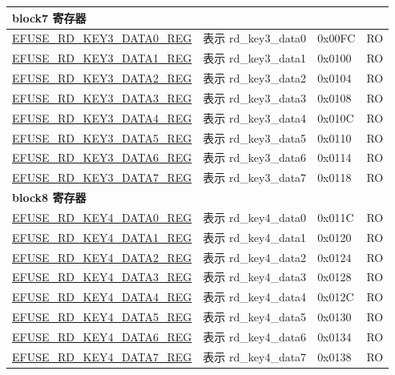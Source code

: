 \begin{longtable}{ | p{7cm} | p{6cm} | p{1.2cm} | p{1.5cm} | }
\multicolumn{4}{|l|}{\textbf{block7 寄存器}} \\ \hline
\hyperref[regdesc:EFUSERDKEY3DATANREG]{EFUSE\_RD\_KEY3\_DATA0\_REG} & 表示 rd\_key3\_data0 & 0x00FC & RO \\ \hline
\hyperref[regdesc:EFUSERDKEY3DATANREG]{EFUSE\_RD\_KEY3\_DATA1\_REG} & 表示 rd\_key3\_data1 & 0x0100 & RO \\ \hline
\hyperref[regdesc:EFUSERDKEY3DATANREG]{EFUSE\_RD\_KEY3\_DATA2\_REG} & 表示 rd\_key3\_data2 & 0x0104 & RO \\ \hline
\hyperref[regdesc:EFUSERDKEY3DATANREG]{EFUSE\_RD\_KEY3\_DATA3\_REG} & 表示 rd\_key3\_data3 & 0x0108 & RO \\ \hline
\hyperref[regdesc:EFUSERDKEY3DATANREG]{EFUSE\_RD\_KEY3\_DATA4\_REG} & 表示 rd\_key3\_data4 & 0x010C & RO \\ \hline
\hyperref[regdesc:EFUSERDKEY3DATANREG]{EFUSE\_RD\_KEY3\_DATA5\_REG} & 表示 rd\_key3\_data5 & 0x0110 & RO \\ \hline
\hyperref[regdesc:EFUSERDKEY3DATANREG]{EFUSE\_RD\_KEY3\_DATA6\_REG} & 表示 rd\_key3\_data6 & 0x0114 & RO \\ \hline
\hyperref[regdesc:EFUSERDKEY3DATANREG]{EFUSE\_RD\_KEY3\_DATA7\_REG} & 表示 rd\_key3\_data7 & 0x0118 & RO \\ \hline
\multicolumn{4}{|l|}{\textbf{block8 寄存器}} \\ \hline
\hyperref[regdesc:EFUSERDKEY4DATANREG]{EFUSE\_RD\_KEY4\_DATA0\_REG} & 表示 rd\_key4\_data0 & 0x011C & RO \\ \hline
\hyperref[regdesc:EFUSERDKEY4DATANREG]{EFUSE\_RD\_KEY4\_DATA1\_REG} & 表示 rd\_key4\_data1 & 0x0120 & RO \\ \hline
\hyperref[regdesc:EFUSERDKEY4DATANREG]{EFUSE\_RD\_KEY4\_DATA2\_REG} & 表示 rd\_key4\_data2 & 0x0124 & RO \\ \hline
\hyperref[regdesc:EFUSERDKEY4DATANREG]{EFUSE\_RD\_KEY4\_DATA3\_REG} & 表示 rd\_key4\_data3 & 0x0128 & RO \\ \hline
\hyperref[regdesc:EFUSERDKEY4DATANREG]{EFUSE\_RD\_KEY4\_DATA4\_REG} & 表示 rd\_key4\_data4 & 0x012C & RO \\ \hline
\hyperref[regdesc:EFUSERDKEY4DATANREG]{EFUSE\_RD\_KEY4\_DATA5\_REG} & 表示 rd\_key4\_data5 & 0x0130 & RO \\ \hline
\hyperref[regdesc:EFUSERDKEY4DATANREG]{EFUSE\_RD\_KEY4\_DATA6\_REG} & 表示 rd\_key4\_data6 & 0x0134 & RO \\ \hline
\hyperref[regdesc:EFUSERDKEY4DATANREG]{EFUSE\_RD\_KEY4\_DATA7\_REG} & 表示 rd\_key4\_data7 & 0x0138 & RO \\ \hline

\end{longtable}

